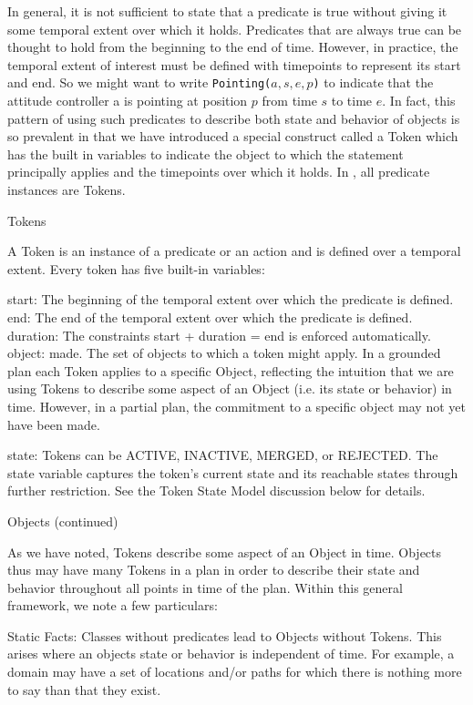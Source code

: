 In general, it is not sufficient to state that a predicate is true
without giving it some temporal extent over which it holds. Predicates
that are always true can be thought to hold from the beginning to the
end of time. However, in practice, the temporal extent of interest
must be defined with timepoints to represent its start and end. So we
might want to write \texttt{Pointing($a,s,e,p$)} to indicate that the
attitude controller a is pointing at position $p$ from time $s$ to
time $e$. In fact, this pattern of using such predicates to describe
both state and behavior of objects is so prevalent in \eu that we have
introduced a special construct called a Token which has the built in
variables to indicate the object to which the statement principally
applies and the timepoints over which it holds. In \eu, all predicate
instances are Tokens.

Tokens

A Token is an instance of a predicate or an action and is defined over
a temporal extent. Every token has five built-in variables:

start: The beginning of the temporal extent over which the predicate
is defined.  end: The end of the temporal extent over which the
predicate is defined.  duration: The constraints start + duration =
end is enforced automatically.  object: made. The set of objects to
which a token might apply. In a grounded plan each Token applies to a
specific Object, reflecting the intuition that we are using Tokens to
describe some aspect of an Object (i.e. its state or behavior) in
time. However, in a partial plan, the commitment to a specific object
may not yet have been made.

state: Tokens can be ACTIVE, INACTIVE, MERGED, or REJECTED. The state
variable captures the token's current state and its reachable states
through further restriction. See the Token State Model discussion
below for details.

Objects (continued)

As we have noted, Tokens describe some aspect of an Object in
time. Objects thus may have many Tokens in a plan in order to describe
their state and behavior throughout all points in time of the
plan. Within this general framework, we note a few particulars:

Static Facts: Classes without predicates lead to Objects without
Tokens. This arises where an objects state or behavior is independent
of time. For example, a domain may have a set of locations and/or
paths for which there is nothing more to say than that they exist.

